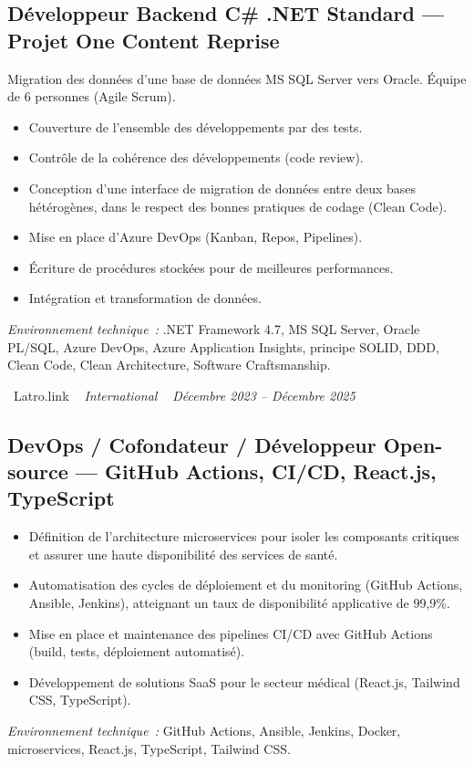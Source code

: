 \documentclass[10pt,a4paper]{article}
\begin{document}
\vspace{6pt}

\subsection*{Développeur Backend C\# .NET Standard --- Projet One Content Reprise}
\color{darkgray}
Migration des données d'une base de données MS SQL Server vers Oracle. Équipe de 6 personnes (Agile Scrum).
\begin{itemize}
  \item Couverture de l'ensemble des développements par des tests.
  \item Contrôle de la cohérence des développements (code review).
  \item Conception d'une interface de migration de données entre deux bases hétérogènes, dans le respect des bonnes pratiques de codage (Clean Code).
  \item Mise en place d'Azure DevOps (Kanban, Repos, Pipelines).
  \item Écriture de procédures stockées pour de meilleures performances.
  \item Intégration et transformation de données.
\end{itemize}
\textit{Environnement technique~:} .NET Framework 4.7, MS SQL Server, Oracle PL/SQL, Azure DevOps, Azure Application Insights, principe SOLID, DDD, Clean Code, Clean Architecture, Software Craftsmanship.

\vspace{10pt}

\noindent\textcolor{primary}{ \faBuilding\ Latro.link} \quad
\textit{ \small \textcolor{darkgray}{ \faMapMarker\ } International } \hfill
\textit{ \small \textcolor{darkgray}{ \faCalendar\ } Décembre 2023 -- Décembre 2025 }

\vspace{4pt}

\subsection*{DevOps / Cofondateur / Développeur Open-source --- GitHub Actions, CI/CD, React.js, TypeScript}
\color{darkgray}
\begin{itemize}
  \item Définition de l'architecture microservices pour isoler les composants critiques et assurer une haute disponibilité des services de santé.
  \item Automatisation des cycles de déploiement et du monitoring (GitHub Actions, Ansible, Jenkins), atteignant un taux de disponibilité applicative de 99,9\%.
  \item Mise en place et maintenance des pipelines CI/CD avec GitHub Actions (build, tests, déploiement automatisé).
  \item Développement de solutions SaaS pour le secteur médical (React.js, Tailwind CSS, TypeScript).
\end{itemize}
\textit{Environnement technique~:} GitHub Actions, Ansible, Jenkins, Docker, microservices, React.js, TypeScript, Tailwind CSS.
\end{document}
